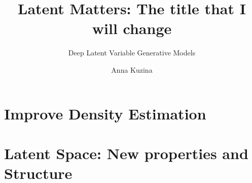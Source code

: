 \documentclass[nobib,justified,titlepage,nofonts,a4paper]{tufte-book}
\author[Anna Kuzina]{Anna Kuzina}
\title{Latent Matters: The title that I will change}
\subtitle{Deep Latent Variable Generative Models}
\begin{document}
\frontmatter
\maketitlepage
\pagestyle{plain}

% 
\tableofcontents


\mainmatter


% 

\listoftodos[Notes]

\part{Improve Density Estimation} \label{part:1}





\part{Latent Space: New properties and Structure}\label{part:2}


% 



% 






\end{document}
